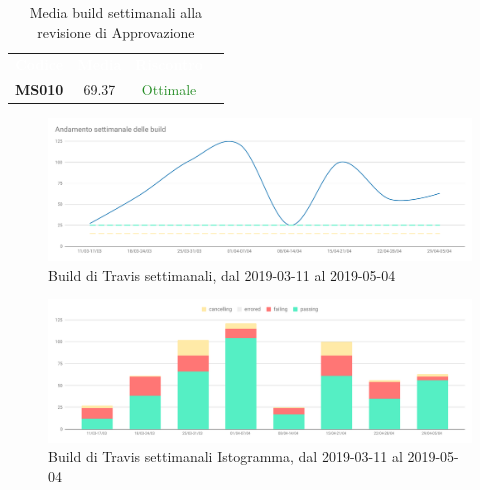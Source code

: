     \begin{table}[H]
        \centering
        \begin{tabular}{cccc}
        \rowcolor{greySWEight}
        \textcolor{white}{\textbf{Codice}} &
        \textcolor{white}{\textbf{Media}} &
        \textcolor{white}{\textbf{Riscontro}}\\
        \textbf{MS010}& 69.37 & \textcolor{ForestGreen}{Ottimale} \\
    
        \end{tabular}
        \caption{Media build settimanali alla revisione di Approvazione}
    \end{table}
    \begin{figure}[H]
        \centering
        \includegraphics[width=165mm]{sez/App_Esito/Approvazione/graph/buildSettimanaliStorico.pdf}
        \caption{Build di Travis settimanali, dal 2019-03-11 al 2019-05-04}
    \end{figure}
    \begin{figure}[H]
        \centering
        \includegraphics[width=165mm]{sez/App_Esito/Approvazione/graph/buildSettimanali.pdf}
        \caption{Build di Travis settimanali Istogramma, dal 2019-03-11 al 2019-05-04}
    \end{figure}

